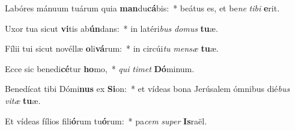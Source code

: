 \item Labóres mánuum tuárum quia \textbf{man}du\textbf{cá}bis:~* beátus es, et be\textit{ne} \textit{ti}\textit{bi} \textbf{e}rit.
\item Uxor tua sicut \textbf{vi}tis ab\textbf{ún}dans:~* in latéri\textit{bus} \textit{do}\textit{mus} \textbf{tu}æ.
\item Fílii tui sicut novéllæ \textbf{o}li\textbf{vá}rum:~* in circúi\textit{tu} \textit{men}\textit{sæ} \textbf{tu}æ.
\item Ecce sic benedi\textbf{cé}tur \textbf{ho}mo,~* \textit{qui} \textit{ti}\textit{met} \textbf{Dó}minum.
\item Benedícat tibi Dómi\textbf{nus} ex \textbf{Si}on:~* et vídeas bona Jerúsalem ómnibus dié\textit{bus} \textit{vi}\textit{tæ} \textbf{tu}æ.
\item Et vídeas fílios fili\textbf{ó}rum tu\textbf{ó}rum:~* pa\textit{cem} \textit{su}\textit{per} \textbf{Is}raël.
